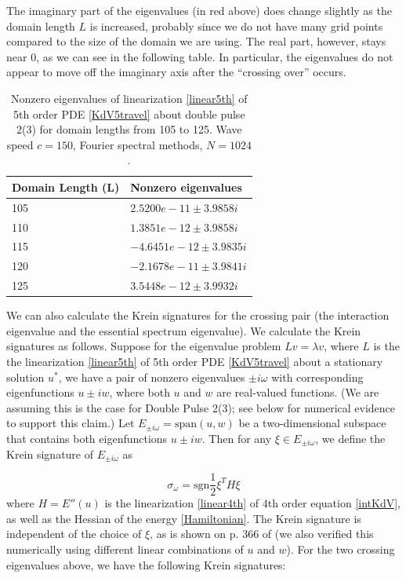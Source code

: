 \documentclass[12pt]{article}
\begin{document}
The imaginary part of the eigenvalues (in red above) does change slightly as the domain length $L$ is increased, probably since we do not have many grid points compared to the size of the domain we are using. The real part, however, stays near 0, as we can see in the following table. In particular, the eigenvalues do not appear to move off the imaginary axis after the ``crossing over'' occurs.

\begin{table}[H]
\begin{tabular}{l|l}
Domain Length (L)  & Nonzero eigenvalues \\ \hline
    105 &  $  2.5200e-11 \pm 3.9858i$   \\
    110 &  $  1.3851e-12  \pm 3.9858i$   \\
    115 &  $  -4.6451e-12 \pm 3.9835i$   \\
    120 &  $ -2.1678e-11 \pm 3.9841i$   \\
    125 &  $ 3.5448e-12 \pm 3.9932i$   \\
\end{tabular}

\caption{Nonzero eigenvalues of linearization \eqref{linear5th} of 5th order PDE \eqref{KdV5travel} about double pulse 2(3) for domain lengths from 105 to 125. Wave speed $c = 150$, Fourier spectral methods, $N = 1024$.}
\end{table}

We can also calculate the Krein signatures for the crossing pair (the interaction eigenvalue and the essential spectrum eigenvalue). We calculate the Krein signatures as follows. Suppose for the eigenvalue problem $Lv = \lambda v$, where $L$ is the the linearization \eqref{linear5th} of 5th order PDE \eqref{KdV5travel} about a stationary solution $u^*$, we have a pair of nonzero eigenvalues $\pm i \omega$ with corresponding eigenfunctions $u \pm i w$, where both $u$ and $w$ are real-valued functions. (We are assuming this is the case for Double Pulse 2(3); see below for numerical evidence to support this claim.) Let $E_{\pm i \omega} = \textrm{span}(u, w)$ be a two-dimensional subspace that contains both eigenfunctions $u \pm i w$. Then for any $\xi \in E_{\pm i \omega}$, we define the Krein signature of $E_{\pm i \omega}$ as 

\begin{equation}\label{kreinsig}
\sigma_\omega = \textrm{sgn} \frac{1}{2} \xi^T H \xi
\end{equation}
where $H = E''(u)$ is the linearization \eqref{linear4th} of 4th order equation \eqref{intKdV}, as well as the Hessian of the energy \eqref{Hamiltonian}. The Krein signature is independent of the choice of $\xi$, as is shown on p. 366 of \cite{Meiss2017} (we also verified this numerically using different linear combinations of $u$ and $w$). For the two crossing eigenvalues above, we have the following Krein signatures:
\end{document}
